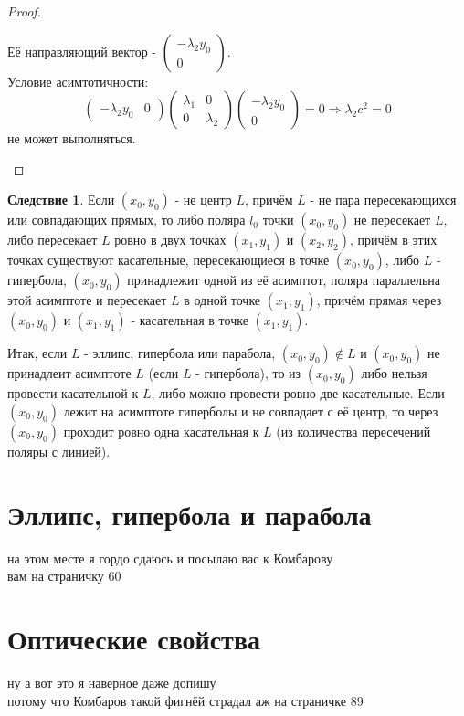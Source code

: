 \documentclass[a4paper, 12pt]{article}
\theoremstyle{definition}
\newtheorem*{consequense}{Следствие}
\begin{document}
\begin{proof}
\begin{enumerate}
			Её направляющий вектор - $\begin{pmatrix} -\lambda_2y_0 \\ 0 \end{pmatrix}$.\\
			Условие асимтотичности: $$\begin{pmatrix} -\lambda_2y_0 & 0 \end{pmatrix}\begin{pmatrix} \lambda_1&0 \\ 0&\lambda_2 \end{pmatrix}\begin{pmatrix} -\lambda_2y_0 \\ 0 \end{pmatrix} = 0 \Rightarrow \lambda_2c^2 = 0$$ не может выполняться.
		\end{enumerate}
	\end{proof}
	\begin{consequense}
		Если $(x_0, y_0)$ - не центр $L$, причём $L$ - не пара пересекающихся или совпадающих прямых, то либо поляра $l_0$ точки $(x_0, y_0)$ не пересекает $L$, либо пересекает $L$ ровно в двух точках $(x_1, y_1)$ и $(x_2, y_2)$, причём в этих точках существуют касательные, пересекающиеся в точке $(x_0, y_0)$, либо $L$ - гипербола, $(x_0, y_0)$ принадлежит одной из её асимптот, поляра параллельна этой асимптоте и пересекает $L$ в одной точке $(x_1, y_1)$, причём прямая через $(x_0, y_0)$ и $(x_1, y_1)$ - касательная в точке $(x_1, y_1)$.
	\end{consequense}
	
	Итак, если $L$ - эллипс, гипербола или парабола, $(x_0, y_0) \notin L$ и $(x_0, y_0)$ не принадлеит асимптоте $L$ (если $L$ - гипербола), то из $(x_0, y_0)$ либо нельзя провести касательной к $L$, либо можно провести ровно две касательные. Если $(x_0, y_0)$ лежит на асимптоте гиперболы и не совпадает с её центр, то через $(x_0, y_0)$ проходит ровно одна касательная к $L$ (из количества пересечений поляры с линией).

	\section{Эллипс, гипербола и парабола}
	на этом месте я гордо сдаюсь и посылаю вас к Комбарову\\
	вам на страничку 60

	\section{Оптические свойства}
	ну а вот это я наверное даже допишу\\
	потому что Комбаров такой фигнёй страдал аж на страничке 89
\end{document}

